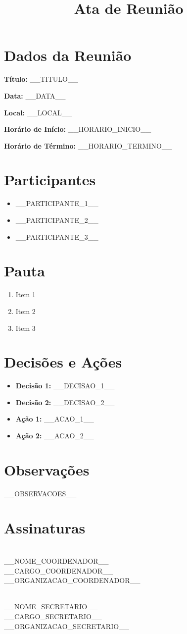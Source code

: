 \documentclass[a4paper,12pt]{article}
\title{Ata de Reunião}
\author{}
\date{}
\begin{document}
\maketitle

\section*{Dados da Reunião}
\textbf{Título:} __TITULO__

\textbf{Data:} __DATA__

\textbf{Local:} __LOCAL__

\textbf{Horário de Início:} __HORARIO_INICIO__

\textbf{Horário de Término:} __HORARIO_TERMINO__

\section*{Participantes}
\begin{itemize}
    \item __PARTICIPANTE_1__
    \item __PARTICIPANTE_2__
    \item __PARTICIPANTE_3__
\end{itemize}

\section*{Pauta}
\begin{enumerate}
    \item Item 1
    \item Item 2
    \item Item 3
\end{enumerate}

\section*{Decisões e Ações}
\begin{itemize}
    \item \textbf{Decisão 1:} __DECISAO_1__
    \item \textbf{Decisão 2:} __DECISAO_2__
    \item \textbf{Ação 1:} __ACAO_1__
    \item \textbf{Ação 2:} __ACAO_2__
\end{itemize}

\section*{Observações}
__OBSERVACOES__

\section*{Assinaturas}
\vspace{2cm}
\hrulefill \\
__NOME_COORDENADOR__ \\
__CARGO_COORDENADOR__ \\
__ORGANIZACAO_COORDENADOR__

\vspace{2cm}
\hrulefill \\
__NOME_SECRETARIO__ \\
__CARGO_SECRETARIO__ \\
__ORGANIZACAO_SECRETARIO__
\end{document}
